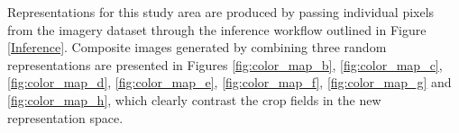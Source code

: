 \documentclass[journal,article,submit,pdftex,moreauthors]{Definitions/mdpi}
\begin{document}
Representations for this study area are produced by passing individual pixels from the imagery dataset through the inference workflow outlined in Figure \ref{Inference}. Composite images generated by combining three random representations are presented in Figures \ref{fig:color_map_b}, \ref{fig:color_map_c}, \ref{fig:color_map_d}, \ref{fig:color_map_e}, \ref{fig:color_map_f}, \ref{fig:color_map_g} and \ref{fig:color_map_h}, which clearly contrast the crop fields in the new representation space.
\end{document}
